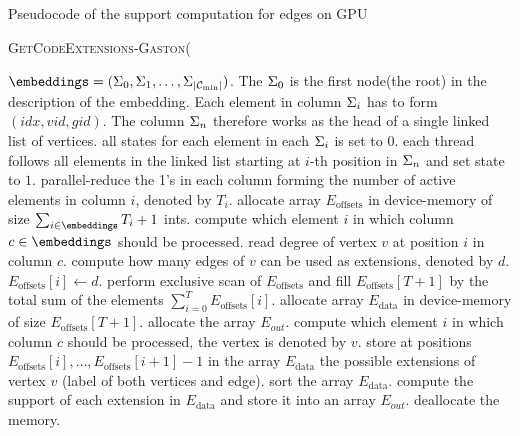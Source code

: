 \begin{algorithm}[!htb]
\caption{Pseudocode of the support computation for edges on GPU}
\vbox{\textsc{GetCodeExtensions-Gaston}(}
\begin{algorithmic}[1]
  \REQUIRE $\embeddings = (\embed_0, \embed_1, \ldots, \embed_{|\mindfscode|})$. The $\Sigma_0$ is the
  first node(the root) in the description of the embedding. Each
  element in column $\Sigma_i$ has to form $(idx, vid, gid)$. The column
  $\Sigma_n$ therefore works as the head of a single linked list of
  vertices. 
  \STATE all states for each element in each $\Sigma_i$ is set to $0$.
     \STATE each thread follows all elements in the linked list
     starting at $i$-th position in $\Sigma_n$ and set state to $1$.
     \STATE parallel-reduce the 1's in each column forming the number
     of active elements in column $i$, denoted by $T_i$.
  \ENDFOR
  \STATE allocate array $E_{\text{offsets}}$ in device-memory of size $\sum_{i\in \embeddings} T_i+1$ ints.
     \STATE compute which element $i$ in which column $c\in\embeddings$ should be processed.
     \STATE read degree of vertex $v$ at position $i$ in column $c$.
     \STATE compute how many edges of $v$ can be used as extensions, denoted by $d$.
     \STATE $E_{\text{offsets}}[i]\leftarrow d$.
     \STATE perform exclusive scan of $E_{\text{offsets}}$ and fill
     $E_{\text{offsets}}[T+1]$ by the total sum of the elements
     $\sum^{T}_{i=0} E_{\text{offsets}}[i]$.
  \ENDFOR
  \STATE allocate array $E_{\text{data}}$ in device-memory of size $E_{\text{offsets}}[T+1]$.
  \STATE allocate the array $E_{out}$.
     \STATE compute which element $i$ in which column $c$ should be processed, the vertex is denoted by $v$.
     \STATE store at positions $E_{\text{offsets}}[i], \ldots,
            E_{\text{offsets}}[i+1]-1$ in the array $E_{\text{data}}$ the
            possible extensions of vertex $v$ (label of both vertices and
            edge).
     \STATE sort the array $E_{\text{data}}$.
     \STATE compute the support of each extension in $E_{\text{data}}$ and store it into an array $E_{out}$.
  \ENDFOR
  \STATE deallocate the memory.
\end{algorithmic}
\end{algorithm}



